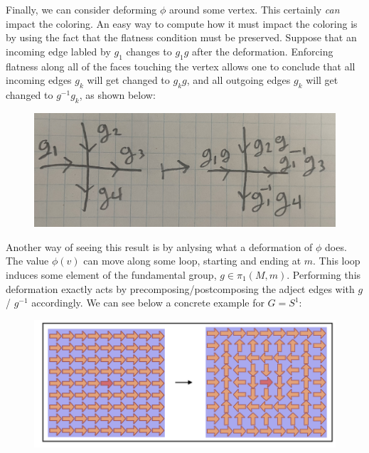 \documentclass{article}
\theoremstyle{definition}
\numberwithin{figure}{section}
\begin{document}
Finally, we can consider deforming $\phi$ around some vertex. This certainly \textit{can} impact the coloring. An easy way to compute how it must impact the coloring is by using the fact that the flatness condition must be preserved. Suppose that an incoming edge labled by $g_1$ changes to $g_1 g$ after the deformation. Enforcing flatness along all of the faces touching the vertex allows one to conclude that all incoming edges $g_k$ will get changed to $g_k g$, and all outgoing edges $g_k$ will get changed to $g^{-1}g_k$, as shown below:

\begin{figure}[h]
\begin{center}
\includegraphics[scale=.04]{gauge-transformation}
\end{center}
\end{figure}

Another way of seeing this result is by anlysing what a deformation of $\phi$ does. The value $\phi(v)$ can move along some loop, starting and ending at $m$. This loop induces some element of the fundamental group, $g\in \pi_1(M,m)$. Performing this deformation exactly acts by precomposing/postcomposing the adject edges with $g$/ $g^{-1}$ accordingly. We can see below a concrete example for $G=S^{1}$:

\begin{figure}[h]
\begin{center}
\includegraphics[scale=.45]{twisting}
\end{center}
\end{figure}
\end{document}

